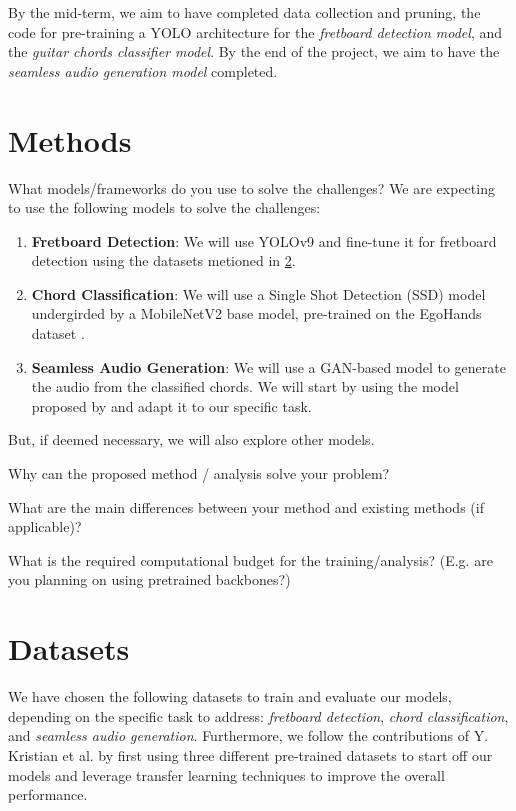 \documentclass[10pt,twocolumn,letterpaper]{article}
\begin{document}
By the mid-term, we aim to have completed data collection and pruning, the code for pre-training a YOLO architecture for the \emph{fretboard detection model}, and the \emph{guitar chords classifier model}. By the end of the project, we aim to have the \emph{seamless audio generation model} completed.

\section{Methods}\label{sec:methods}

What models/frameworks do you use to solve the challenges?
We are expecting to use the following models to solve the challenges:
\begin{enumerate}
    \item \textbf{Fretboard Detection}: We will use YOLOv9 \cite{wang2024yolov9} and fine-tune it for fretboard detection using the datasets metioned in \cref{sec:datasets}.
    \item \textbf{Chord Classification}: We will use a Single Shot Detection (SSD) model undergirded by a MobileNetV2 base model, pre-trained on the EgoHands dataset \cite{Bambach_2015_ICCV}.
    \item \textbf{Seamless Audio Generation}: We will use a GAN-based model to generate the audio from the classified chords. We will start by using the model proposed by \cite{su2020audeo} and adapt it to our specific task.
\end{enumerate}

But, if deemed necessary, we will also explore other models.

Why can the proposed method / analysis solve your problem?

What are the main differences between your method and existing methods (if applicable)?

What is the required computational budget for the training/analysis? (E.g. are you planning on using pretrained backbones?)

\section{Datasets}\label{sec:datasets}

We have chosen the following datasets to train and evaluate our models, depending on the specific task to address: \emph{fretboard detection}, \emph{chord classification}, and \emph{seamless audio generation}. Furthermore, we follow the contributions of Y. Kristian et al. \cite{Kristian_Zaman_Tenoyo_Jodhinata_2024} by first using three different pre-trained datasets to start off our models and leverage transfer learning techniques to improve the overall performance.
\end{document}
